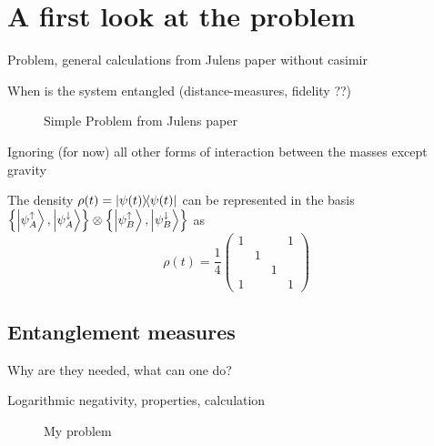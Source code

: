 \chapter{A first look at the problem}\label{cha:first-look}

Problem, general calculations from Julens paper without casimir

When is the system entangled (distance-measures, fidelity ??)

\begin{figure}[!htbp]
  \centering
  \def\svgwidth{\textwidth}
  
  \caption{Simple Problem from Julens paper}
\end{figure}

Ignoring (for now) all other forms of interaction between the masses except gravity

The density $\rho(t) = \ketbra{\psi(t)}$ can be represented in the basis $\left\{ \ket{\psi_A^\uparrow}, \ket{\psi_A^\downarrow} \right\}\otimes \left\{ \ket{\psi_B^\uparrow}, \ket{\psi_B^\downarrow} \right\}$ as
\begin{equation}
  \rho(t) = \frac{1}{4}
  \begin{pmatrix}
    1 &   &   & 1 \\
      & 1 &   &   \\
      &   & 1 &   \\
    1 &   &   & 1
  \end{pmatrix}
\end{equation}


\section{Entanglement measures}
Why are they needed, what can one do?

Logarithmic negativity, properties, calculation





\begin{figure}[!htbp]
  \centering
  \def\svgwidth{0.9\textwidth}
  
  \caption{My problem}
\end{figure}


